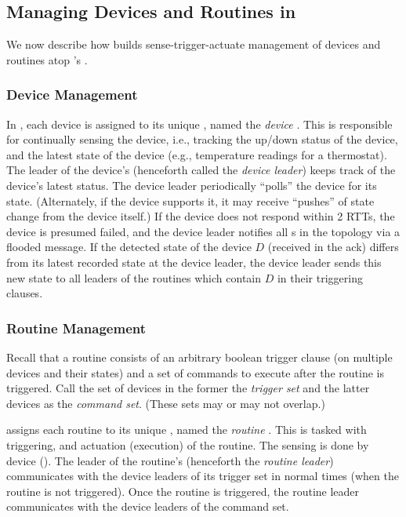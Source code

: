 \subsection{Managing Devices and Routines in \sysname}
\label{comesh:section:mngmt}

We now describe how \sysname{} builds sense-trigger-actuate management of devices and routines atop 's \kgroups.

\subsubsection{Device Management}
\label{comesh:sec:devmgmt}

In \sysname{}, each device is assigned to its unique \kgroup{}, named the {\it device \kgroup}. This \kgroup{} is responsible for continually sensing the device, i.e., tracking the up/down status of the device, and the latest state of the device (e.g., temperature readings for a thermostat).
The leader of the device's \kgroup{} (henceforth called the {\it device leader}) keeps track of the device's latest status. The device leader 
periodically ``polls'' the device for its state. (Alternately, if the device supports it, it may receive ``pushes'' of state change from the device itself.) If the device does not respond within 2 RTTs, the device is presumed failed, and the device leader notifies all \smart{}s in the topology via a flooded message. If the detected state of the device $D$ (received in the ack) differs from its latest recorded state at the device leader, the device leader sends this new state to all leaders of the routines which contain $D$  in their triggering clauses.

\subsubsection{Routine Management}
\label{comesh:sec:routinemgt}
\label{comesh:subsection:rtn_mngmt}
Recall that a routine consists of an arbitrary boolean trigger clause
(on multiple devices and their states) and a set of commands to execute after the routine is triggered. Call the set of devices in the former the {\it trigger set}
and the latter devices as the {\it command set}.
(These sets may or may not overlap.)

\sysname{} assigns each routine to its unique \kgroup{}, named the {\it routine \kgroup}. This \kgroup{} is tasked with
triggering, and actuation (execution) of the routine. The sensing is done
by device \kgroups{}  (). The leader of the routine's \kgroup{} (henceforth the {\it routine leader}) communicates with the device leaders of its trigger set in normal times (when the routine is not triggered). Once the routine is triggered, the routine leader communicates with the device leaders of the command set. 


